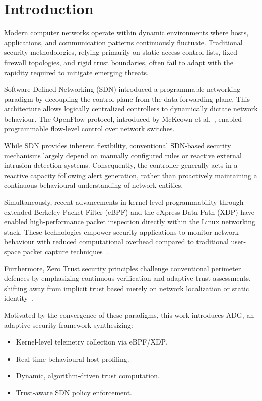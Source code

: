 \documentclass[conference]{IEEEtran}
\begin{document}
\section{Introduction}

Modern computer networks operate within dynamic environments where hosts, applications, and communication patterns continuously fluctuate. Traditional security methodologies, relying primarily on static access control lists, fixed firewall topologies, and rigid trust boundaries, often fail to adapt with the rapidity required to mitigate emerging threats.

Software Defined Networking (SDN) introduced a programmable networking paradigm by decoupling the control plane from the data forwarding plane. This architecture allows logically centralized controllers to dynamically dictate network behaviour. The OpenFlow protocol, introduced by McKeown et al.~\cite{mckeown2008openflow}, enabled programmable flow-level control over network switches.

While SDN provides inherent flexibility, conventional SDN-based security mechanisms largely depend on manually configured rules or reactive external intrusion detection systems. Consequently, the controller generally acts in a reactive capacity following alert generation, rather than proactively maintaining a continuous behavioural understanding of network entities.

Simultaneously, recent advancements in kernel-level programmability through extended Berkeley Packet Filter (eBPF) and the eXpress Data Path (XDP) have enabled high-performance packet inspection directly within the Linux networking stack. These technologies empower security applications to monitor network behaviour with reduced computational overhead compared to traditional user-space packet capture techniques~\cite{miano2023sketching}.

Furthermore, Zero Trust security principles challenge conventional perimeter defences by emphasizing continuous verification and adaptive trust assessments, shifting away from implicit trust based merely on network localization or static identity~\cite{nist800207}.

Motivated by the convergence of these paradigms, this work introduces ADG, an adaptive security framework synthesizing:
\begin{itemize}
\item Kernel-level telemetry collection via eBPF/XDP.
\item Real-time behavioural host profiling.
\item Dynamic, algorithm-driven trust computation.
\item Trust-aware SDN policy enforcement.
\end{itemize}
\end{document}

